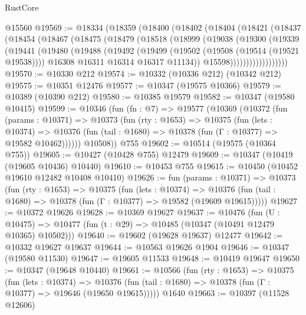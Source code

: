 \begin{lexlean}{RustCore}
\begin{coremodule}
    @15560
@19569 := @18334
    (@18359
      (@18400
        (@18402
          (@18404
            (@18421
              (@18437
                (@18454
                  (@18467
                    (@18475
                      (@18479
                        (@18518
                          (@18999
                            (@19038
                              (@19300
                                (@19339
                                  (@19441
                                    (@19480
                                      (@19488
                                        (@19492
                                          (@19499
                                            (@19502 (@19508 (@19514 (@19521 @19538))))
                                            @16308
                                            @16311
                                            @16314
                                            @16317
                                            @11134))
                                        @15598))))))))))))))))))
@19570 := @10330 @212
@19574 := @10332 (@10336 @212) (@10342 @212)
@19575 := @10351 @12476
@19577 := @10347 (@19575 @10366)
@19579 := @10389 (@10390 @212)
@19580 := @10385 @19579
@19582 := @10347 (@19580 @10415)
@19599 := @10346
    (fun (fn : @7) =>
    @19577
      (@10369
        (@10372
          (fun (params : @10371) =>
          @10373
            (fun (rty : @1653) =>
            @10375
              (fun (lets : @10374) =>
              @10376 (fun (tail : @1680) => @10378 (fun (Γ : @10377) => @19582 @10462))))))
        @10508))
    @755
@19602 := @10514 (@19575 (@10364 @755))
@19605 := @10427 (@10428 @755) @12479
@19609 := @10347 (@10419 (@19605 @10436) @10440)
@19610 := @10453 @755
@19615 := @10450 (@10452 @19610 @12482 @10408 @10410)
@19626 := fun (params : @10371) =>
  @10373
    (fun (rty : @1653) =>
    @10375
      (fun (lets : @10374) =>
      @10376 (fun (tail : @1680) => @10378 (fun (Γ : @10377) => @19582 (@19609 @19615)))))
@19627 := @10372 @19626
@19628 := @10369 @19627
@19637 := @10476
    (fun (U : @10475) => @10477 (fun (t : @29) => @10485 (@10347 (@10491 @12479 @10365) @10502)))
@19640 := @19602 (@19628 @19637) @12477
@19642 := @10332 @19627 @19637
@19644 := @10563 @19626 @1904
@19646 := @10347 (@19580 @11530)
@19647 := @19605 @11533
@19648 := @10419 @19647
@19650 := @10347 (@19648 @10440)
@19661 := @10566
    (fun (rty : @1653) =>
    @10375
      (fun (lets : @10374) =>
      @10376 (fun (tail : @1680) => @10378 (fun (Γ : @10377) => @19646 (@19650 @19615)))))
    @1640
@19663 := @10397 (@11528 @12606)

\end{coremodule}
\end{lexlean}
